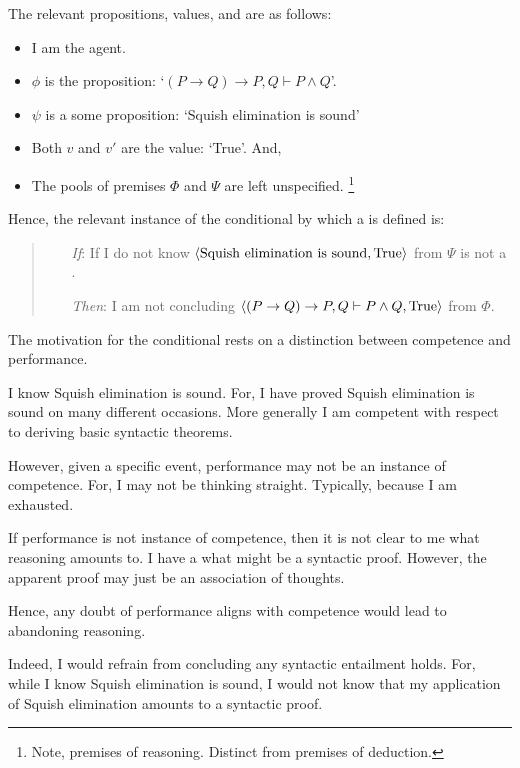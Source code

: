 \begin{note}
  The relevant propositions, values, and  are as follows:
  \begin{itemize}[noitemsep]
  \item
    I am the agent.
  \item
    \(\phi\) is the proposition: `\((P \rightarrow Q) \rightarrow P, Q \vdash P \land Q\)'.
  \item
    \(\psi\) is a some proposition: `Squish elimination is sound'
  \item
    Both \(v\) and \(v'\) are the value: `True'.
    And,
  \item
    The pools of premises \(\Phi\) and \(\Psi\) are left unspecified.%
    \footnote{
      Note, premises of reasoning.
      Distinct from premises of deduction.
    }
  \end{itemize}

  Hence, the relevant instance of the conditional by which a \requ{} is defined is:

  \begin{quote}
    \begin{itemize}
    \item[\emph{If}:]
      If I do not know \(\langle \text{Squish elimination is sound}, \text{True} \rangle\) from \(\Psi\) is not a \fc{}.
    \item[\emph{Then}:]
      I am not concluding \(\langle (P \rightarrow Q) \rightarrow P, Q \vdash P \land Q, \text{True} \rangle\) from \(\Phi\).
    \end{itemize}
  \end{quote}
\end{note}

\begin{note}
  The motivation for the conditional rests on a distinction between competence and performance.

  I know Squish elimination is sound.
  For, I have proved Squish elimination is sound on many different occasions.
  More generally I am competent with respect to deriving basic syntactic theorems.

  However, given a specific event, performance may not be an instance of competence.
  For, I may not be thinking straight.
  Typically, because I am exhausted.

  If performance is not instance of competence, then it is not clear to me what reasoning amounts to.
  I have a what might be a syntactic proof.
  However, the apparent proof may just be an association of thoughts.

  Hence, any doubt of performance aligns with competence would lead to abandoning reasoning.

  Indeed, I would refrain from concluding any syntactic entailment holds.
  For, while I know Squish elimination is sound, I would not know that my application of Squish elimination amounts to a syntactic proof.
\end{note}

